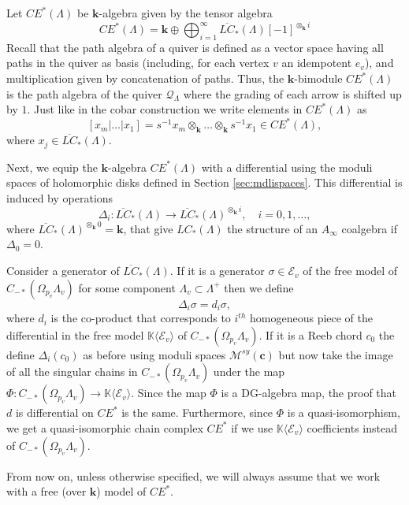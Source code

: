 \documentclass{gtpart}
\renewcommand{\k}{\mathbf{k}}
\newcommand{\K}{\mathbb{K}}
\begin{document}
Let $CE^*(\Lambda)$ be $\k$-algebra given by the tensor algebra 
\[ 
CE^*(\Lambda) = \k \oplus \bigoplus_{i=1}^\infty \overline{LC}_{\ast}(\Lambda)[-1]^{\otimes_{\k} i}
\]
Recall that the path algebra of a quiver is defined as a vector space having all paths in the quiver as basis (including, for each vertex $v$ an idempotent $e_v$), and multiplication given by concatenation of paths. Thus, the $\k$-bimodule $CE^*(\Lambda)$ is the path algebra of the quiver $\mathcal{Q}_\Lambda$ where the grading of each arrow is shifted up by $1$. Just like in the cobar construction we write elements in $CE^{\ast}(\Lambda)$ as
\[ 
[x_{m}|\dots|x_{1}] = s^{-1}x_{m}\otimes_\k \dots \otimes_\k s^{-1}x_{1}\in CE^{\ast}(\Lambda),
\]
where $x_{j}\in \overline{LC}_{\ast}(\Lambda)$.

Next, we equip the $\k$-algebra $CE^*(\Lambda)$ with a differential using the moduli spaces of holomorphic disks defined in Section \ref{sec:mdlispaces}. This differential is induced by operations 
\[ 
\Delta_i \colon \overline{LC}_{\ast}(\Lambda) \to \overline{LC}_*(\Lambda)^{\otimes_\k i}, \quad i=0,1,\ldots, 
\]
where $\overline{LC}_{\ast}(\Lambda)^{\otimes_\k 0}=\k$,
that give $LC_*(\Lambda)$ the structure of an $A_\infty$ coalgebra if $\Delta_0=0$.

Consider a generator of $\overline{LC}_{\ast}(\Lambda)$. If it is a generator $\sigma \in
\mathcal{E}_v$ of the free model of $C_{-\ast}(\Omega_{p_v} \Lambda_{v})$ for some component
$\Lambda_{v}\subset\Lambda^{+}$ then we define
\begin{equation}\label{eq:coalgchain}
\Delta_{i}\sigma = d_{i}\sigma,
\end{equation}
where $d_{i}$ is the co-product that corresponds to $i^{th}$ homogeneous piece of the differential
in the free model $\K\langle \mathcal{E}_v \rangle$ of $C_{-*}(\Omega_{p_v}
\Lambda_v)$. If it is a Reeb chord $c_{0}$ the define
$\Delta_i(c_0)$ as before using moduli spaces $\mathcal{M}^{sy}(\mathbf{c})$ but now take the image of all
the singular chains in $C_{-*}(\Omega_{p_v} \Lambda_v)$ under the map $\Phi :
C_{-*}(\Omega_{p_v} \Lambda_v) \to \K \langle \mathcal{E}_v \rangle$. Since the map $\Phi$ is a DG-algebra map, the proof that $d$
is differential on $CE^*$ is the same. Furthermore, since $\Phi$ is a quasi-isomorphism, we
get a quasi-isomorphic chain complex $CE^*$ if we use $\K\langle \mathcal{E}_v \rangle$ coefficients instead of
$C_{-*}(\Omega_{p_v} \Lambda_v)$.

From now on, unless otherwise specified, we will always assume that we work with a free (over $\k$) model of $CE^*$. 
\end{document}
